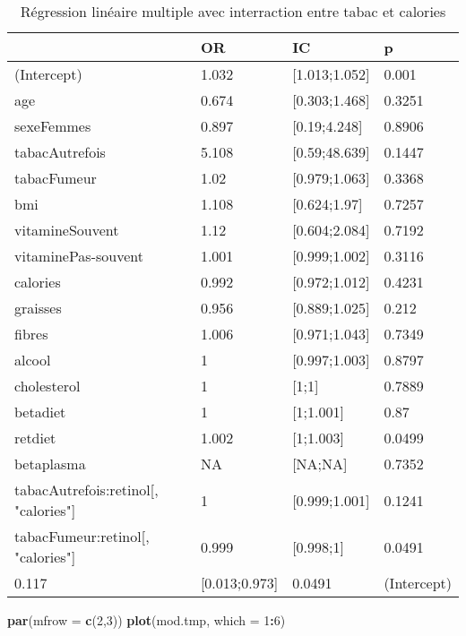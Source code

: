 \documentclass[]{article}
\newenvironment{Shaded}{\begin{snugshade}}{\end{snugshade}}
\newcommand{\KeywordTok}[1]{\textcolor[rgb]{0.13,0.29,0.53}{\textbf{#1}}}
\newcommand{\DataTypeTok}[1]{\textcolor[rgb]{0.13,0.29,0.53}{#1}}
\newcommand{\DecValTok}[1]{\textcolor[rgb]{0.00,0.00,0.81}{#1}}
\newcommand{\OperatorTok}[1]{\textcolor[rgb]{0.81,0.36,0.00}{\textbf{#1}}}
\newcommand{\NormalTok}[1]{#1}
\begin{document}
\begin{table}

\caption{\label{tab:unnamed-chunk-85}Régression linéaire multiple avec interraction entre tabac et calories}
\centering
\begin{tabular}[t]{l|l|l|l}
\hline
  & OR & IC & p\\
\hline
\rowcolor[HTML]{BBD2E1}  (Intercept) & 1.032 & [1.013;1.052] & 0.001\\
\hline
age & 0.674 & [0.303;1.468] & 0.3251\\
\hline
\rowcolor[HTML]{BBD2E1}  sexeFemmes & 0.897 & [0.19;4.248] & 0.8906\\
\hline
tabacAutrefois & 5.108 & [0.59;48.639] & 0.1447\\
\hline
\rowcolor[HTML]{BBD2E1}  tabacFumeur & 1.02 & [0.979;1.063] & 0.3368\\
\hline
bmi & 1.108 & [0.624;1.97] & 0.7257\\
\hline
\rowcolor[HTML]{BBD2E1}  vitamineSouvent & 1.12 & [0.604;2.084] & 0.7192\\
\hline
vitaminePas-souvent & 1.001 & [0.999;1.002] & 0.3116\\
\hline
\rowcolor[HTML]{BBD2E1}  calories & 0.992 & [0.972;1.012] & 0.4231\\
\hline
graisses & 0.956 & [0.889;1.025] & 0.212\\
\hline
\rowcolor[HTML]{BBD2E1}  fibres & 1.006 & [0.971;1.043] & 0.7349\\
\hline
alcool & 1 & [0.997;1.003] & 0.8797\\
\hline
\rowcolor[HTML]{BBD2E1}  cholesterol & 1 & [1;1] & 0.7889\\
\hline
betadiet & 1 & [1;1.001] & 0.87\\
\hline
\rowcolor[HTML]{BBD2E1}  retdiet & 1.002 & [1;1.003] & 0.0499\\
\hline
betaplasma & NA & [NA;NA] & 0.7352\\
\hline
\rowcolor[HTML]{BBD2E1}  tabacAutrefois:retinol[, "calories"] & 1 & [0.999;1.001] & 0.1241\\
\hline
tabacFumeur:retinol[, "calories"] & 0.999 & [0.998;1] & 0.0491\\
\hline
\rowcolor[HTML]{BBD2E1}  0.117 & [0.013;0.973] & 0.0491 & (Intercept)\\
\hline
\end{tabular}
\end{table}

\begin{Shaded}
\begin{Highlighting}[]
\KeywordTok{par}\NormalTok{(}\DataTypeTok{mfrow =} \KeywordTok{c}\NormalTok{(}\DecValTok{2}\NormalTok{,}\DecValTok{3}\NormalTok{))}
\KeywordTok{plot}\NormalTok{(mod.tmp, }\DataTypeTok{which =} \DecValTok{1}\OperatorTok{:}\DecValTok{6}\NormalTok{)}
\end{Highlighting}
\end{Shaded}
\end{document}
